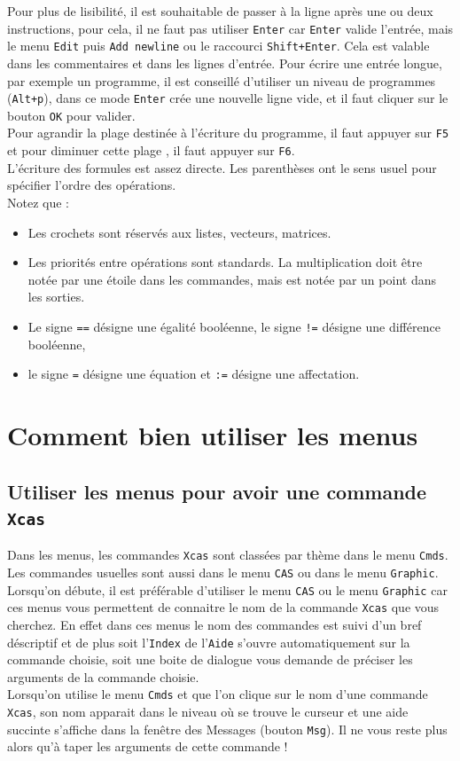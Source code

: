 \documentclass[a4paper,11pt]{article}
\begin{document}
Pour plus de lisibilit\'e, il est souhaitable de passer \`a la ligne apr\`es
une ou deux instructions, pour cela, il ne faut pas utiliser {\tt Enter} car 
{\tt Enter} valide l'entr\'ee, mais le menu {\tt Edit} puis 
{\tt Add newline} ou le raccourci {\tt Shift+Enter}.
Cela est valable dans les commentaires et dans 
les lignes d'entr\'ee. Pour \'ecrire une entr\'ee longue, par
exemple un programme, il est conseill\'e d'utiliser un niveau
de programmes (\verb|Alt+p|), dans ce mode {\tt Enter} cr\'ee
une nouvelle ligne vide, et il faut cliquer sur le bouton {\tt OK}
pour valider.\\
Pour agrandir la plage destin\'ee \`a l'\'ecriture du programme, il faut 
appuyer sur {\tt F5} et pour diminuer cette plage , il faut 
appuyer sur {\tt F6}.\\
L'\'ecriture des formules est assez directe. Les parenth\`eses ont le sens 
usuel pour sp\'ecifier l'ordre des op\'erations. \\
Notez que :
\begin{itemize}
\item Les crochets sont r\'eserv\'es aux listes, vecteurs, matrices.
\item Les priorit\'es entre op\'erations sont standards. 
La multiplication doit \^etre
not\'ee par une \'etoile dans les commandes, mais est not\'ee par un point dans
les sorties.
\item
Le signe \verb|==| d\'esigne une \'egalit\'e bool\'eenne, le signe \verb|!=| 
d\'esigne une diff\'erence bool\'eenne, 
\item le signe \verb|=| 
d\'esigne une \'equation et \verb|:=| d\'esigne une affectation.
\end{itemize}


\section{Comment bien utiliser les menus}
\subsection{Utiliser les menus pour avoir une commande {\tt Xcas}}
Dans les menus, les commandes {\tt Xcas} sont class\'ees par th\`eme dans le 
menu {\tt Cmds}. Les commandes usuelles sont aussi dans le menu {\tt CAS} ou 
dans le menu {\tt Graphic}. \\
Lorsqu'on d\'ebute, il est pr\'ef\'erable d'utiliser le menu {\tt CAS} ou 
le menu {\tt Graphic} car ces menus vous permettent de connaitre le nom de la 
commande {\tt Xcas} que vous cherchez. En effet dans ces menus le nom des 
commandes est suivi d'un bref d\'escriptif et de plus soit l'{\tt Index} de 
l'{\tt Aide} s'ouvre automatiquement sur la commande choisie, soit une boite de
dialogue vous demande de pr\'eciser les arguments de la commande choisie.\\
Lorsqu'on utilise le menu {\tt Cmds} et que l'on clique sur le nom d'une 
commande {\tt Xcas}, son nom apparait dans le niveau o\`u se trouve le curseur 
et une aide succinte s'affiche dans la fen\^etre des Messages (bouton 
{\tt Msg}). Il ne vous reste plus alors qu'\`a taper les arguments de cette 
commande !
\end{document}
